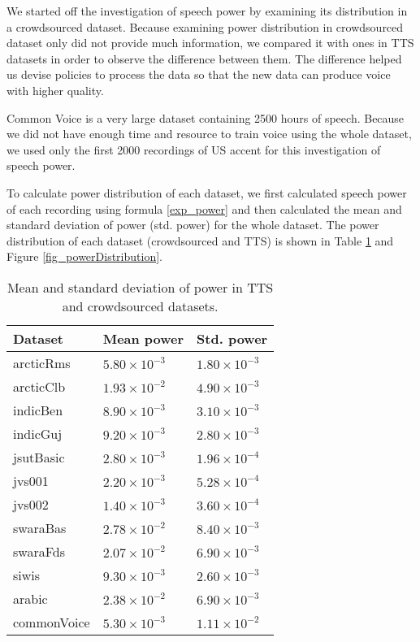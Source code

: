 \documentclass[12pt]{article}
\begin{document}
We started off the investigation of speech power by examining its distribution in a crowdsourced dataset. Because examining power distribution in crowdsourced dataset only did not provide much information, we compared it with ones in TTS datasets in order to observe the difference between them. The difference helped us devise policies to process the data so that the new data can produce voice with higher quality.

Common Voice is a very large dataset containing 2500 hours of speech. Because we did not have enough time and resource to train voice using the whole dataset, we used only the first 2000 recordings of US accent for this investigation of speech power.

To calculate power distribution of each dataset, we first calculated speech power of each recording using formula \ref{exp_power} and then calculated the mean and standard deviation of power (std. power) for the whole dataset. The power distribution of each dataset (crowdsourced and TTS) is shown in Table \ref{tab_powerDistribution} and Figure \ref{fig_powerDistribution}.

\begin{table}[]
\begin{center}
\caption{Mean and standard deviation of power in TTS and crowdsourced datasets.}
\label{tab_powerDistribution}
\vspace{3mm}
\begin{tabular}{|l|l|l|}
\hline
Dataset & Mean power & Std. power \\
\hline
arcticRms   & $5.80\times10^{-3}$ & $1.80\times10^{-3}$ \\
arcticClb   & $1.93\times10^{-2}$ & $4.90\times10^{-3}$ \\
indicBen    & $8.90\times10^{-3}$ & $3.10\times10^{-3}$ \\
indicGuj    & $9.20\times10^{-3}$ & $2.80\times10^{-3}$ \\
jsutBasic   & $2.80\times10^{-3}$ & $1.96\times10^{-4}$ \\
jvs001      & $2.20\times10^{-3}$ & $5.28\times10^{-4}$ \\
jvs002      & $1.40\times10^{-3}$ & $3.60\times10^{-4}$ \\
swaraBas    & $2.78\times10^{-2}$ & $8.40\times10^{-3}$ \\
swaraFds    & $2.07\times10^{-2}$ & $6.90\times10^{-3}$ \\
siwis       & $9.30\times10^{-3}$ & $2.60\times10^{-3}$ \\
arabic      & $2.38\times10^{-2}$ & $6.90\times10^{-3}$ \\
commonVoice & $5.30\times10^{-3}$ & $1.11\times10^{-2}$ \\
\hline
\end{tabular}
\end{center}
\end{table}
\end{document}
